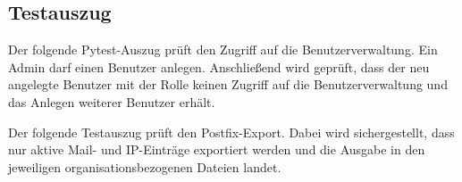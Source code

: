 \subsection{Testauszug}
\label{app:Testauszug}

Der folgende Pytest-Auszug prüft den Zugriff auf die Benutzerverwaltung. Ein
Admin darf einen Benutzer anlegen. Anschließend wird geprüft, dass der neu
angelegte Benutzer mit der Rolle  keinen Zugriff auf die
Benutzerverwaltung und das Anlegen weiterer Benutzer erhält.



Der folgende Testauszug prüft den Postfix-Export. Dabei wird sichergestellt,
dass nur aktive Mail- und IP-Einträge exportiert werden und die Ausgabe in den
jeweiligen organisationsbezogenen Dateien landet.


